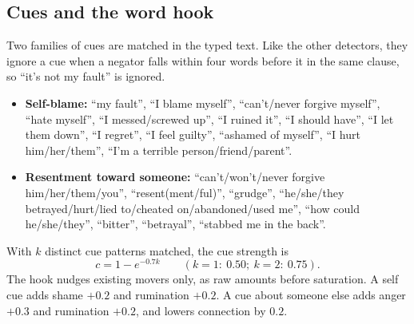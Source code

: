 \documentclass[10pt]{article}
\theoremstyle{definition}
\theoremstyle{remark}
\begin{document}
\subsection{Cues and the word hook}
Two families of cues are matched in the typed text. Like the other detectors, they ignore a cue when a negator falls within four words before it in the same clause, so ``it's not my fault'' is ignored.
\begin{itemize}
\item \textbf{Self-blame:} ``my fault'', ``I blame myself'', ``can't/never forgive myself'', ``hate myself'', ``I messed/screwed up'', ``I ruined it'', ``I should have'', ``I let them down'', ``I regret'', ``I feel guilty'', ``ashamed of myself'', ``I hurt him/her/them'', ``I'm a terrible person/friend/parent''.
\item \textbf{Resentment toward someone:} ``can't/won't/never forgive him/\allowbreak her/\allowbreak them/\allowbreak you'', ``resent(ment/ful)'', ``grudge'', ``he/she/they betrayed/hurt/lied to/cheated on/abandoned/used me'', ``how could he/she/they'', ``bitter'', ``betrayal'', ``stabbed me in the back''.
\end{itemize}
With $k$ distinct cue patterns matched, the cue strength is
\begin{equation}
c = 1-e^{-0.7k}\qquad(k=1:\ 0.50;\ k=2:\ 0.75).
\end{equation}
The hook nudges existing movers only, as raw amounts before saturation. A self cue adds shame $+0.2$ and rumination $+0.2$. A cue about someone else adds anger $+0.3$ and rumination $+0.2$, and lowers connection by $0.2$.
\end{document}
